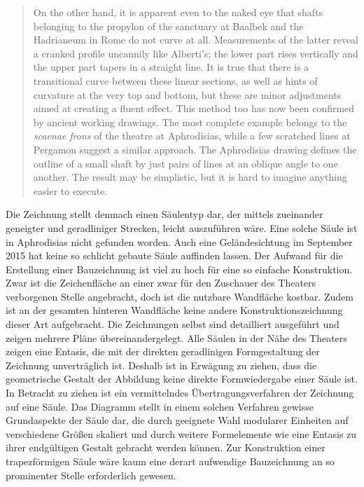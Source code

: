 \documentclass[twocolumn]{bmcart}
\begin{document}
\begin{quotation}{\footnotesize
On the other hand, it is apparent even to the naked eye that shafts belonging to the propylon of the sanctuary at Baalbek and the Hadrianeum in Rome do not curve at all. Measurements of the latter reveal a cranked profile uncannily like Alberti’s; the lower part rises vertically and the upper part tapers in a straight line. It is true that there is a transitional curve between these linear sections, as well as hints of curvature at the very top and bottom, but these are minor adjustments aimed at creating a fluent effect. This method too has now been confirmed by ancient working drawings. The most complete example belongs to the \textit{scaenae frons} of the theatre at Aphrodisias, while a few scratched lines at Pergamon suggest a similar approach. The Aphrodisias drawing defines the outline of a small shaft by just pairs of lines at an oblique angle to one another. The result may be simplistic, but it is hard to imagine anything easier to execute.\cite[p. 128]{jonesmarkwilson2000}}
\end{quotation}

Die Zeichnung stellt demnach einen Säulentyp dar, der mittels zueinander geneigter und geradliniger Strecken, leicht auszuführen wäre. Eine solche Säule ist in Aphrodisias nicht gefunden worden. Auch eine Geländesichtung im September 2015 hat keine so schlicht gebaute Säule auffinden lassen. Der Aufwand für die Erstellung einer Bauzeichnung ist viel zu hoch für eine so einfache Konstruktion. Zwar ist die Zeichenfläche an einer zwar für den Zuschauer des Theaters verborgenen Stelle angebracht, doch ist die nutzbare Wandfläche kostbar. Zudem ist an der gesamten hinteren Wandfläche keine andere Konstruktionszeichnung dieser Art aufgebracht. Die Zeichnungen selbst sind detailliert ausgeführt und zeigen mehrere Pläne übereinandergelegt. Alle Säulen in der Nähe des Theaters zeigen eine Entasis, die mit der direkten geradlinigen Formgestaltung der Zeichnung unverträglich ist. Deshalb ist in Erwägung zu ziehen, dass die geometrische Gestalt der Abbildung keine direkte Formwiedergabe einer Säule ist. In Betracht zu ziehen ist ein vermittelndes Übertragungsverfahren der Zeichnung auf eine Säule. Das Diagramm stellt in einem solchen Verfahren gewisse Grundaspekte der Säule dar, die durch geeignete Wahl modularer Einheiten auf verschiedene Größen skaliert und durch weitere Formelemente wie eine Entasis zu ihrer endgültigen Gestalt gebracht werden können. Zur Konstruktion einer trapezförmigen Säule wäre kaum eine derart aufwendige Bauzeichnung an so prominenter Stelle erforderlich gewesen.
\end{document}
